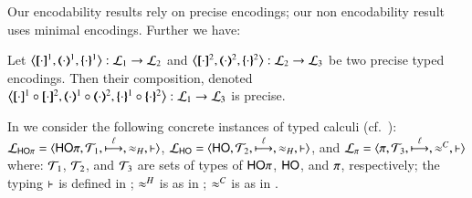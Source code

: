 \smallskip 

\noi %
Our encodability results %
rely on precise encodings; 
our non encodability result %
uses minimal encodings.
Further we have:

\smallskip 

\begin{proposition}\rm
	\label{pro:composition}
	Let %
	$\enco{\map{\cdot}^{1}, \mapt{\cdot}^{1}, \mapa{\cdot}^{1}}: \tyl{L}_1 \to \tyl{L}_2$
	and 
	$\enco{\map{\cdot}^{2}, \mapt{\cdot}^{2}, \mapa{\cdot}^{2}}: \tyl{L}_2 \to \tyl{L}_3$
	be two precise typed encodings.
	Then their composition, denoted 
	$\enco{\map{\cdot}^{1} \circ \map{\cdot}^{2}, \mapt{\cdot}^{1} \circ \mapt{\cdot}^{2}, \mapa{\cdot}^{1}\circ \mapa{\cdot}^{2}}: \tyl{L}_1 \to \tyl{L}_3$
	is precise. 
\end{proposition}

\smallskip

In  %
we consider the following concrete instances of typed calculi (cf.~):
%
	$\tyl{L}_{\HOp}=\calc{\HOp}{{\cal{T}}_1}{\hby{\ell}}{\wb_H}{\proves}$,
	$\tyl{L}_{\HO}=\calc{\HO}{{\cal{T}}_2}{\hby{\ell}}{\wb_H}{\proves}$, and
	$\tyl{L}_{\sessp}=\calc{\sessp}{{\cal{T}}_3}{\hby{\ell}}{\fwb}{\proves}$ 
%
where: 
${\cal{T}}_1$, ${\cal{T}}_2$, 
and ${\cal{T}}_3$
are sets of types of $\mathsf{HO}\pi$, $\mathsf{HO}$, and $\pi$, respectively;
the typing $\vdash$ is defined in 
;  
$\approx^H$ is as in ; 
$\approx^C$ is as in .


